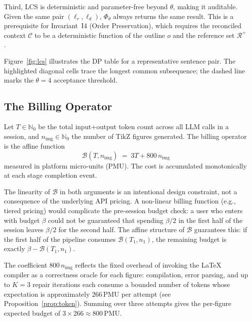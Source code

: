 Third, LCS is deterministic and parameter-free beyond $\theta$, making it auditable.
Given the same pair $(\ell_r,\ell_d)$, $\Phi_\theta$ always returns the same result.
This is a prerequisite for Invariant~I4 (Order Preservation), which requires the
reconciled context $\mathcal{C}$ to be a deterministic function of the outline $o$
and the reference set $\mathcal{R}^+$.

Figure~\ref{fig:lcs} illustrates the DP table for a representative sentence pair.
The highlighted diagonal cells trace the longest common subsequence; the dashed line
marks the $\theta=4$ acceptance threshold.



\subsection{The Billing Operator}

\begin{definition}
\label{def:billing}
Let $T\in\mathbb{N}_0$ be the total input+output token count across all LLM calls in a
session, and $n_{\mathrm{img}}\in\mathbb{N}_0$ the number of TikZ figures generated.
The billing operator is the affine function
\[
  \mathcal{B}(T, n_{\mathrm{img}}) \;=\; 3T + 800\,n_{\mathrm{img}}
\]
measured in platform micro-units (PMU).
The cost is accumulated monotonically at each stage completion event.
\end{definition}

The linearity of $\mathcal{B}$ in both arguments is an intentional design constraint,
not a consequence of the underlying API pricing.
A non-linear billing function (e.g., tiered pricing) would complicate the pre-session
budget check: a user who enters with budget $\beta$ could not be guaranteed that spending
$\beta/2$ in the first half of the session leaves $\beta/2$ for the second half.
The affine structure of $\mathcal{B}$ guarantees this: if the first half of the pipeline
consumes $\mathcal{B}(T_1, n_1)$, the remaining budget is exactly
$\beta - \mathcal{B}(T_1, n_1)$.

The coefficient $800\,n_{\mathrm{img}}$ reflects the fixed overhead of invoking the
\LaTeX{} compiler as a correctness oracle for each figure: compilation, error parsing,
and up to $K=3$ repair iterations each consume a bounded number of tokens whose
expectation is approximately $266\,\text{PMU}$ per attempt (see Proposition~\ref{prop:token}).
Summing over three attempts gives the per-figure expected budget of
$3\times 266 \approx 800\,\text{PMU}$.

